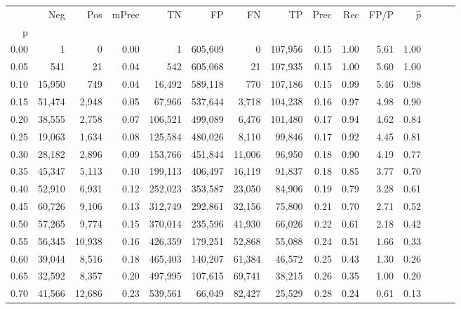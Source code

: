 \begin{tabular}{rrrrrrrrrrrrrrr}
\toprule
{} &     Neg &     Pos & mPrec &       TN &       FP &       FN &       TP &  Prec &   Rec &  FP/P & $\hat{p}$ \\
p    &         &         &       &          &          &          &          &       &       &       &           \\
\midrule
0.00 &       1 &       0 &  0.00 &        1 &  605,609 &        0 &  107,956 &  0.15 &  1.00 &  5.61 &      1.00 \\
0.05 &     541 &      21 &  0.04 &      542 &  605,068 &       21 &  107,935 &  0.15 &  1.00 &  5.60 &      1.00 \\
0.10 &  15,950 &     749 &  0.04 &   16,492 &  589,118 &      770 &  107,186 &  0.15 &  0.99 &  5.46 &      0.98 \\
0.15 &  51,474 &   2,948 &  0.05 &   67,966 &  537,644 &    3,718 &  104,238 &  0.16 &  0.97 &  4.98 &      0.90 \\
0.20 &  38,555 &   2,758 &  0.07 &  106,521 &  499,089 &    6,476 &  101,480 &  0.17 &  0.94 &  4.62 &      0.84 \\
0.25 &  19,063 &   1,634 &  0.08 &  125,584 &  480,026 &    8,110 &   99,846 &  0.17 &  0.92 &  4.45 &      0.81 \\
0.30 &  28,182 &   2,896 &  0.09 &  153,766 &  451,844 &   11,006 &   96,950 &  0.18 &  0.90 &  4.19 &      0.77 \\
0.35 &  45,347 &   5,113 &  0.10 &  199,113 &  406,497 &   16,119 &   91,837 &  0.18 &  0.85 &  3.77 &      0.70 \\
0.40 &  52,910 &   6,931 &  0.12 &  252,023 &  353,587 &   23,050 &   84,906 &  0.19 &  0.79 &  3.28 &      0.61 \\
0.45 &  60,726 &   9,106 &  0.13 &  312,749 &  292,861 &   32,156 &   75,800 &  0.21 &  0.70 &  2.71 &      0.52 \\
0.50 &  57,265 &   9,774 &  0.15 &  370,014 &  235,596 &   41,930 &   66,026 &  0.22 &  0.61 &  2.18 &      0.42 \\
0.55 &  56,345 &  10,938 &  0.16 &  426,359 &  179,251 &   52,868 &   55,088 &  0.24 &  0.51 &  1.66 &      0.33 \\
0.60 &  39,044 &   8,516 &  0.18 &  465,403 &  140,207 &   61,384 &   46,572 &  0.25 &  0.43 &  1.30 &      0.26 \\
0.65 &  32,592 &   8,357 &  0.20 &  497,995 &  107,615 &   69,741 &   38,215 &  0.26 &  0.35 &  1.00 &      0.20 \\
0.70 &  41,566 &  12,686 &  0.23 &  539,561 &   66,049 &   82,427 &   25,529 &  0.28 &  0.24 &  0.61 &      0.13 \\

\end{tabular}

